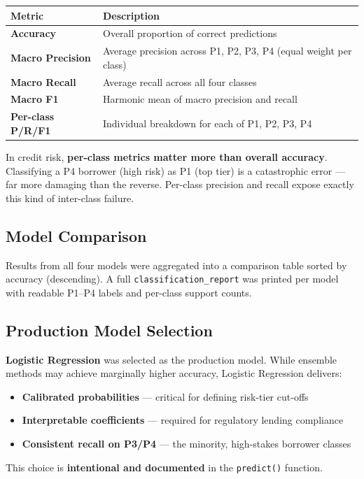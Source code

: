 \documentclass[12pt,a4paper]{article}
\begin{document}
\begin{center}
\begin{tabular}{>{\bfseries}p{3.5cm} p{10cm}}
  \toprule
  \textbf{Metric} & \textbf{Description} \\
  \midrule
  Accuracy         & Overall proportion of correct predictions \\
  Macro Precision  & Average precision across P1, P2, P3, P4 (equal weight per class) \\
  Macro Recall     & Average recall across all four classes \\
  Macro F1         & Harmonic mean of macro precision and recall \\
  Per-class P/R/F1 & Individual breakdown for each of P1, P2, P3, P4 \\
  \bottomrule
\end{tabular}
\end{center}

\begin{warnbox}
  In credit risk, \textbf{per-class metrics matter more than overall accuracy}.
  Classifying a P4 borrower (high risk) as P1 (top tier) is a catastrophic error
  --- far more damaging than the reverse. Per-class precision and recall expose
  exactly this kind of inter-class failure.
\end{warnbox}

\subsection{Model Comparison}

Results from all four models were aggregated into a comparison table sorted by
accuracy (descending). A full \texttt{classification\_report} was printed per
model with readable P1--P4 labels and per-class support counts.

\subsection{Production Model Selection}

\begin{keybox}
  \textbf{Logistic Regression} was selected as the production model.
  While ensemble methods may achieve marginally higher accuracy,
  Logistic Regression delivers:
  \begin{itemize}
    \item[\faAngleRight] \textbf{Calibrated probabilities}
          --- critical for defining risk-tier cut-offs
    \item[\faAngleRight] \textbf{Interpretable coefficients}
          --- required for regulatory lending compliance
    \item[\faAngleRight] \textbf{Consistent recall on P3/P4}
          --- the minority, high-stakes borrower classes
  \end{itemize}
  This choice is \textbf{intentional and documented} in the \texttt{predict()} function.
\end{keybox}
\end{document}

